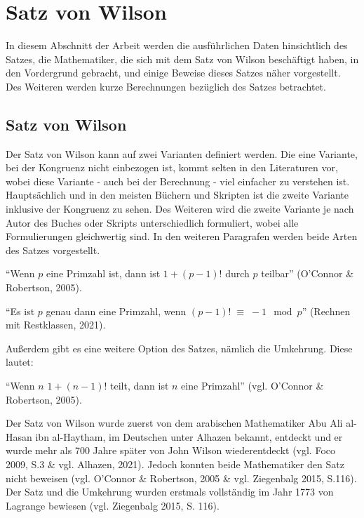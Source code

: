 %
%

\chapter{Satz von Wilson}

In diesem Abschnitt der Arbeit werden die ausführlichen Daten
hinsichtlich des Satzes, die Mathematiker, die sich mit dem
Satz von Wilson beschäftigt haben, in den Vordergrund gebracht,
und einige Beweise dieses Satzes näher vorgestellt. Des Weiteren
werden kurze Berechnungen bezüglich des Satzes betrachtet.
\vspace{.2cm}

\section{Satz von Wilson}

Der Satz von Wilson kann auf zwei Varianten definiert werden.
Die eine Variante, bei der Kongruenz nicht einbezogen ist,
kommt selten in den Literaturen vor, wobei diese Variante -
auch bei der Berechnung - viel einfacher zu verstehen ist.
Hauptsächlich und in den meisten Büchern und Skripten ist die
zweite Variante inklusive der Kongruenz zu sehen. Des Weiteren
wird die zweite Variante je nach Autor des Buches oder Skripts
unterschiedlich formuliert, wobei alle Formulierungen
gleichwertig sind. In den weiteren Paragrafen werden beide
Arten des Satzes vorgestellt.

\begin{theorem}
``Wenn $p$ eine Primzahl ist, dann ist $1 +(p-1)!$ durch
$p$ teilbar'' (O'Connor \& Robertson, 2005).
\end{theorem}

\begin{theorem}
``Es ist $p$ genau dann eine Primzahl, wenn
$(p-1)! \;\equiv\; -1\mod p$''
(Rechnen mit Restklassen, 2021).
\end{theorem}

Außerdem gibt es eine weitere Option des Satzes, nämlich
die Umkehrung. Diese lautet:

\begin{theorem}
``Wenn $n$  $1+(n-1)!$ teilt, dann ist $n$ eine Primzahl''
(vgl. O'Connor \& Robertson, 2005).
\end{theorem}

Der Satz von Wilson wurde zuerst von dem arabischen
Mathematiker Abu Ali al-Hasan ibn al-Haytham, im
Deutschen unter Alhazen bekannt, entdeckt und er wurde
mehr als 700 Jahre später von John Wilson wiederentdeckt
(vgl. Foco 2009, S.3 \& vgl. Alhazen, 2021). Jedoch konnten
beide Mathematiker den Satz nicht beweisen
(vgl. O'Connor \& Robertson, 2005 \& vgl. Ziegenbalg 2015,
S.116). Der Satz und die Umkehrung wurden erstmals
vollständig im Jahr 1773 von Lagrange bewiesen
(vgl. Ziegenbalg 2015, S. 116).



